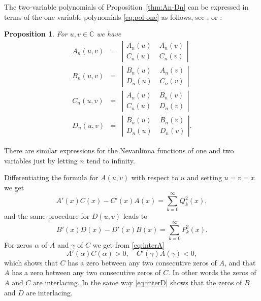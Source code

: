 \documentclass[12pt]{article}
\newtheorem{prop}[thm]{Proposition}
\newcommand{\C}{\mathbb{C}}
\def\C{\mathbb{C}}
\def\D{\mathbb{D}}
\begin{document}
The two-variable polynomials of Proposition~\ref{thm:An-Dn} can be expressed in terms of the one variable polynomials \eqref{eq:pol-one}   as follows, see \cite[p. 123]{Ak}, or \cite{B:S}:
\begin{prop}\label{thm:2to1} For $u, v\in\C$ we have
 \begin{eqnarray*}
A_n(u,v)&=& \left|\begin{array}{cc}
 A_n(u)&\;A_n(v)\\C_n(u)&\;C_n(v)\end{array}\right|\\
 B_n(u,v)&=& \left|\begin{array}{cc}
 B_n(u)&\;A_n(v)\\D_n(u)&\;C_n(v)\end{array}\right|\\
  C_n(u,v)&=& \left|\begin{array}{cc}
 A_n(u)&\;B_n(v)\\C_n(u)&\;D_n(v)\end{array}\right|\\
  D_n(u,v)&=& \left|\begin{array}{cc}
 B_n(u)&\;B_n(v)\\D_n(u)&\;D_n(v)\end{array}\right|.
 \end{eqnarray*}
\end{prop}
There are similar expressions for the Nevanlinna functions of one and two variables just by letting $n$ tend to infinity.

Differentiating the formula for $A(u,v)$ with respect to $u$  and setting $u=v=x$ we get
\begin{equation}\label{eq:interA}
A'(x)C(x)-C'(x)A(x)=\sum_{k=0}^\infty Q_k^2(x),
\end{equation}
and the same procedure for $D(u,v)$ leads to
\begin{equation}\label{eq:interD}
B'(x)D(x)-D'(x)B(x)=\sum_{k=0}^\infty P_k^2(x).
\end{equation}
For  zeros $\alpha$ of $A$ and $\gamma$ of $C$ we  get from \eqref{eq:interA}
$$
A'(\alpha)C(\alpha)>0,\quad C'(\gamma)A(\gamma)<0,
$$
which shows that $C$ has a zero between any two consecutive zeros of $A$, and that $A$ has a  zero between any two consecutive  zeros of $C$. In other words the zeros  of $A$ and $C$ are interlacing. In the same way \eqref{eq:interD} shows that the zeros of $B$ and $D$ 
are interlacing.
\end{document}
